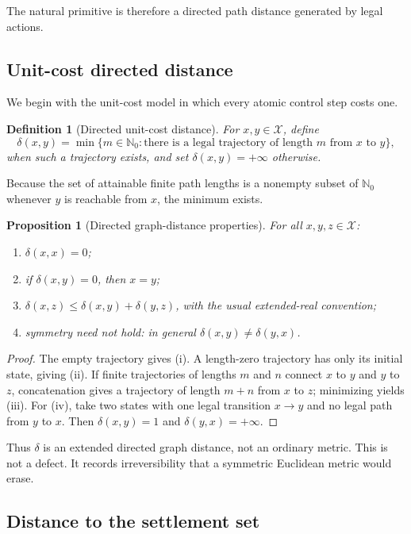 \documentclass[11pt,letterpaper]{article}
\newtheorem{proposition}[theorem]{Proposition}
\newtheorem{definition}[theorem]{Definition}
\theoremstyle{remark}
\newcommand{\X}{\mathcal X}
\newcommand{\N}{\mathbb N}
\begin{document}
The natural primitive is therefore a directed path distance generated by legal actions.

\subsection{Unit-cost directed distance}

We begin with the unit-cost model in which every atomic control step costs one.

\begin{definition}[Directed unit-cost distance]
For $x,y\in\X$, define
\[
\delta(x,y)=\min\{m\in\N_0:\text{there is a legal trajectory of length $m$ from $x$ to $y$}\},
\]
when such a trajectory exists, and set $\delta(x,y)=+\infty$ otherwise.
\end{definition}

Because the set of attainable finite path lengths is a nonempty subset of $\N_0$ whenever $y$ is reachable from $x$, the minimum exists.

\begin{proposition}[Directed graph-distance properties]\label{prop:directedmetric}
For all $x,y,z\in\X$:
\begin{enumerate}[label=(\roman*)]
\item $\delta(x,x)=0$;
\item if $\delta(x,y)=0$, then $x=y$;
\item $\delta(x,z)\le \delta(x,y)+\delta(y,z)$, with the usual extended-real convention;
\item symmetry need not hold: in general $\delta(x,y)\ne\delta(y,x)$.
\end{enumerate}
\end{proposition}

\begin{proof}
The empty trajectory gives (i). A length-zero trajectory has only its initial state, giving (ii). If finite trajectories of lengths $m$ and $n$ connect $x$ to $y$ and $y$ to $z$, concatenation gives a trajectory of length $m+n$ from $x$ to $z$; minimizing yields (iii). For (iv), take two states with one legal transition $x\to y$ and no legal path from $y$ to $x$. Then $\delta(x,y)=1$ and $\delta(y,x)=+\infty$.
\end{proof}

Thus $\delta$ is an extended directed graph distance, not an ordinary metric. This is not a defect. It records irreversibility that a symmetric Euclidean metric would erase.

\subsection{Distance to the settlement set}
\end{document}
